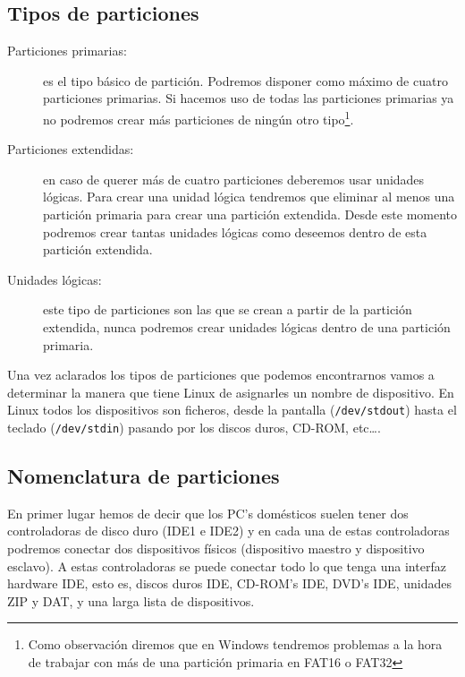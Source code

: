 \subsection{Tipos de particiones}

\begin{description}

\item[Particiones primarias:] es el tipo básico de partición. Podremos
disponer  como  máximo de  cuatro  particiones  primarias. Si  hacemos
uso  de todas  las  particiones  primarias ya  no  podremos crear  más
particiones de ningún otro  tipo\footnote{Como observación diremos que
en Windows  tendremos problemas a la  hora de trabajar con  más de una
partición primaria en FAT16 o FAT32}.

\item[Particiones  extendidas:]  en  caso  de  querer  más  de  cuatro
particiones  deberemos usar  unidades lógicas.  Para crear  una unidad
lógica tendremos  que eliminar  al menos  una partición  primaria para
crear  una  partición extendida.  Desde  este  momento podremos  crear
tantas  unidades  lógicas  como  deseemos  dentro  de  esta  partición
extendida.

\item[Unidades lógicas:] este tipo de particiones son las que se crean
a  partir de  la partición  extendida, nunca  podremos crear  unidades
lógicas dentro de una partición primaria.

\end{description}

Una vez  aclarados los tipos  de particiones que  podemos encontrarnos
vamos a determinar  la manera que tiene Linux de  asignarles un nombre
de dispositivo. En Linux todos los dispositivos son ficheros, desde la
pantalla  ({\tt  /dev/stdout})  hasta el  teclado  ({\tt  /dev/stdin})
pasando por los discos duros, CD-ROM, etc\ldots.

\subsection{Nomenclatura de particiones}

En primer  lugar hemos de decir  que los PC's domésticos  suelen tener
dos controladoras de disco  duro (IDE1 e IDE2) y en  cada una de estas
controladoras podremos conectar  dos dispositivos físicos (dispositivo
maestro  y  dispositivo  esclavo).  A  estas  controladoras  se  puede
conectar todo lo que tenga una  interfaz hardware IDE, esto es, discos
duros IDE,  CD-ROM's IDE, DVD's IDE,  unidades ZIP y DAT,  y una larga
lista de dispositivos.

